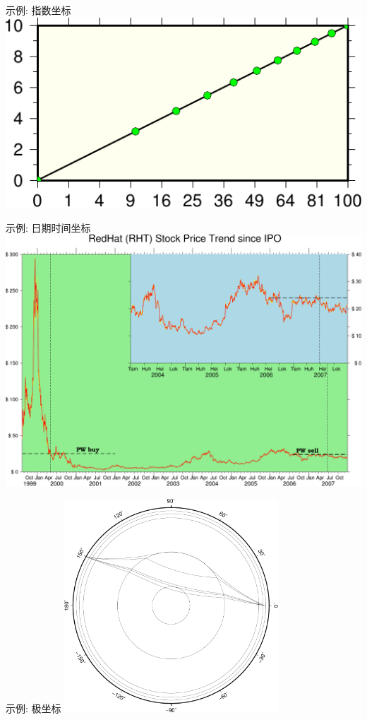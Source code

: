 \documentclass[UTF8, 11pt]{ctexbeamer}
\begin{document}
\begin{frame}{示例: 指数坐标}
\includegraphics[width=\textwidth]{GMT_JX_pow}
\end{frame}
\begin{frame}{示例: 日期时间坐标}
\includegraphics[width=\textwidth]{GMT_JX_calendar}
\end{frame}
\begin{frame}{示例: 极坐标}
\centering
\includegraphics[width=0.6\textwidth]{GMT_JP_polar}
\end{frame}
\end{document}
